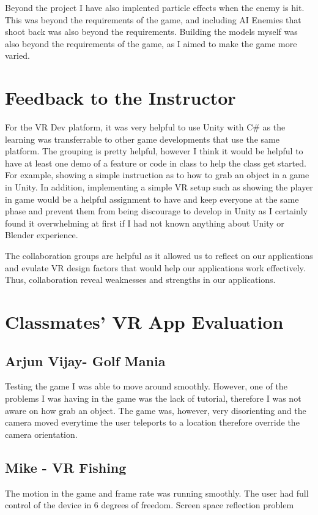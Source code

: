 \documentclass[12pt, twoside]{article}
\begin{document}
Beyond the project I have also implented particle effects when the enemy is hit.
This was beyond the requirements of the game, and including AI Enemies that
shoot back was also beyond the requirements. Building the models myself was also
beyond the requirements of the game, as I aimed to make the game more varied.

\section{Feedback to the Instructor}
For the VR Dev platform, it was very helpful to use Unity with C\# as the
learning was transferrable to other game developments that use the same
platform. The grouping is pretty helpful, however I think it would be helpful to
have at least one demo of a feature or code in class to help the class get
started. For example, showing a simple instruction as to how to grab an object
in a game in Unity. In addition, implementing a simple VR setup such as showing
the player in game would be a helpful assignment to have and keep everyone at
the same phase and prevent them from being discourage to develop in Unity as I
certainly found it overwhelming at first if I had not known anything about Unity
or Blender experience.\par 

The collaboration groups are helpful as it allowed us to reflect on our
applications and evulate VR design factors that would help our applications work
effectively. Thus, collaboration reveal weaknesses and strengths in our
applications.  
\newpage

\section{Classmates' VR App Evaluation}
\subsection{Arjun Vijay- Golf Mania}
Testing the game I was able to move around smoothly. However, one of the
problems I was having in the game was the lack of tutorial, therefore I was not
aware on how grab an object. The game was, however, very disorienting and the
camera moved everytime the user teleports to a location therefore override the
camera orientation. \subsection{Mike - VR Fishing}
The motion in the game and frame rate was running smoothly. The user had full
control of the device in 6 degrees of freedom. Screen space reflection problem
\par
\end{document}
